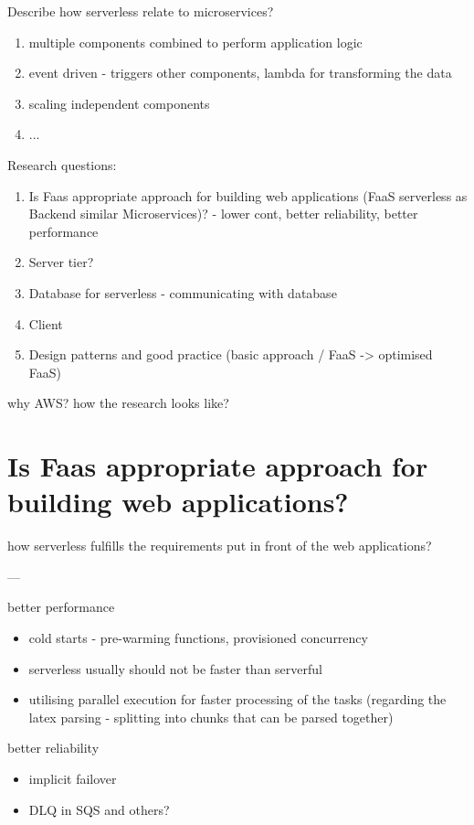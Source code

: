 Describe how serverless relate to microservices?

\begin{enumerate}
    \item multiple components combined to perform application logic
    \item event driven - triggers other components, lambda for transforming the data
    \item scaling independent components
    \item ...
\end{enumerate}

Research questions:

\begin{enumerate}
    \item Is Faas appropriate approach for building web applications (FaaS serverless as Backend similar Microservices)? - lower cont, better reliability, better performance
    \item Server tier?
    \item Database for serverless - communicating with database
    \item Client
    \item Design patterns and good practice (basic approach / FaaS -> optimised FaaS)
\end{enumerate}

why AWS? how the research looks like?

\section{Is Faas appropriate approach for building web applications?}

how serverless fulfills the requirements put in front of the web applications?

---

better performance

\begin{itemize}
    \item cold starts - pre-warming functions, provisioned concurrency
    \item serverless usually should not be faster than serverful
    \item utilising parallel execution for faster processing of the tasks (regarding the latex parsing - splitting into chunks that can be parsed together)
\end{itemize}

better reliability

\begin{itemize}
    \item implicit failover
    \item DLQ in SQS and others?
\end{itemize}

